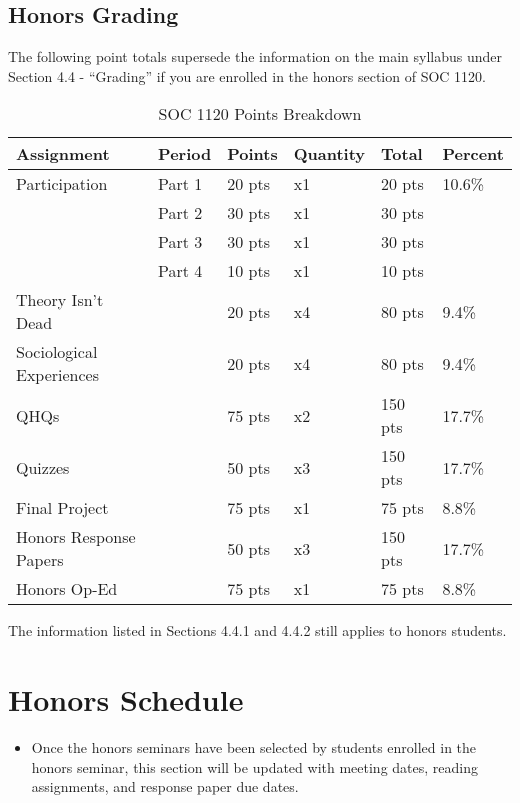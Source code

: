 \documentclass[
]{book}
\newenvironment{rmdblock}[1]
  {\begin{shaded*}
  \begin{itemize}
  \renewcommand{\labelitemi}{
    \raisebox{-.7\height}[0pt][0pt]{
      {\setkeys{Gin}{width=3em,keepaspectratio}\texttt{[image: images/\#1]}}
    }
  }
  \item
  }
  {
  \end{itemize}
  \end{shaded*}
  }
\newenvironment{rmdwarning}
  {\begin{rmdblock}{warning}}
  {\end{rmdblock}}
\begin{document}
\hypertarget{honors-grading}{%
\section{Honors Grading}\label{honors-grading}}

The following point totals supersede the information on the main syllabus under Section 4.4 - ``Grading'' if you are enrolled in the honors section of SOC 1120.

\begin{table}

\caption{\label{tab:unnamed-chunk-5}SOC 1120 Points Breakdown}
\centering
\begin{tabular}[t]{llllll}
\toprule
Assignment & Period & Points & Quantity & Total & Percent\\
\midrule
Participation & Part 1 & 20 pts & x1 & 20 pts & 10.6\%\\
 & Part 2 & 30 pts & x1 & 30 pts & \\
 & Part 3 & 30 pts & x1 & 30 pts & \\
 & Part 4 & 10 pts & x1 & 10 pts & \\
Theory Isn't Dead &  & 20 pts & x4 & 80 pts & 9.4\%\\
\addlinespace
Sociological Experiences &  & 20 pts & x4 & 80 pts & 9.4\%\\
QHQs &  & 75 pts & x2 & 150 pts & 17.7\%\\
Quizzes &  & 50 pts & x3 & 150 pts & 17.7\%\\
Final Project &  & 75 pts & x1 & 75 pts & 8.8\%\\
Honors Response Papers &  & 50 pts & x3 & 150 pts & 17.7\%\\
\addlinespace
Honors Op-Ed &  & 75 pts & x1 & 75 pts & 8.8\%\\
\bottomrule
\end{tabular}
\end{table}

The information listed in Sections 4.4.1 and 4.4.2 still applies to honors students.

\hypertarget{honors-schedule}{%
\chapter{Honors Schedule}\label{honors-schedule}}

\begin{rmdwarning}
Once the honors seminars have been selected by students enrolled in the
honors seminar, this section will be updated with meeting dates, reading
assignments, and response paper due dates.
\end{rmdwarning}

  
\end{document}
